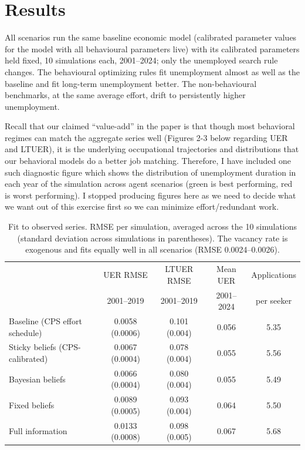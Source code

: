 \documentclass[11pt]{article}
\begin{document}
\section{Results}\label{sec:results}

All scenarios run the same baseline economic model (calibrated parameter values for the model with all behavioural parameters live) with its calibrated
parameters held fixed, 10 simulations each, 2001--2024; only the unemployed search rule changes. The behavioural
optimizing rules fit unemployment almost as well as the baseline and fit long-term unemployment better. The
non-behavioural benchmarks, at the same average effort, drift to persistently higher unemployment.

Recall that our claimed ``value-add'' in the paper is that though most behavioral regimes can match the aggregate series well (Figures 2-3 below regarding UER and LTUER), it is the underlying occupational trajectories and distributions that our behavioral models do a better job matching. Therefore, I have included one such diagnostic figure which shows the distribution of unemployment duration in each year of the simulation across agent scenarios (green is best performing, red is worst performing). I stopped producing figures here as we need to decide what we want out of this exercise first so we can minimize effort/redundant work. 

\begin{table}[H]
\centering
\small
\begin{tabular}{@{}lcccc@{}}
\toprule
 & UER RMSE & LTUER RMSE & Mean UER & Applications \\
 & 2001--2019 & 2001--2019 & 2001--2024 & per seeker \\
\midrule
Baseline (CPS effort schedule) & 0.0058 (0.0006) & 0.101 (0.004) & 0.056 & 5.35 \\
\midrule
Sticky beliefs (CPS-calibrated) & 0.0067 (0.0004) & 0.078 (0.004) & 0.055 & 5.56 \\
Bayesian beliefs & 0.0066 (0.0004) & 0.080 (0.004) & 0.055 & 5.49 \\
\midrule
Fixed beliefs & 0.0089 (0.0005) & 0.093 (0.004) & 0.064 & 5.50 \\
Full information & 0.0133 (0.0008) & 0.098 (0.005) & 0.067 & 5.68 \\
\bottomrule
\end{tabular}
\caption{Fit to observed series. RMSE per simulation, averaged across the 10 simulations (standard deviation across
simulations in parentheses). The vacancy rate is exogenous and fits equally well in all scenarios (RMSE
0.0024--0.0026).}
\end{table}
\end{document}
